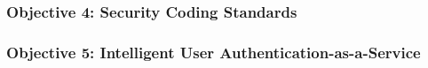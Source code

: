 \documentclass[a4paper,11pt]{article}
\begin{document}

\subsubsection*{Objective 4: Security Coding Standards}



\subsubsection*{Objective 5: Intelligent User Authentication-as-a-Service}
\vspace{-6pt}
\end{document}
